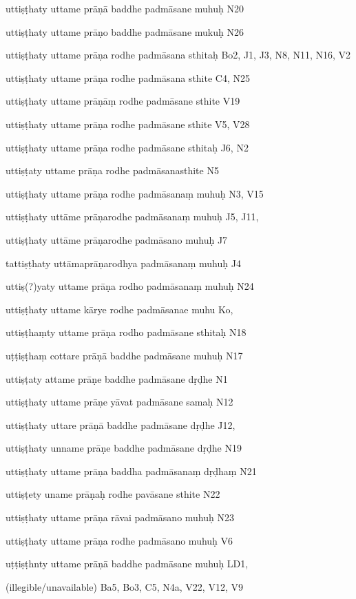 \begin{ekdosis}
\begin{marma}[hp01_055]
\begin{marma}[hp02_009]
\begin{marma}[hp02_011]
\begin{marma}[hp02_012]
\item[uttiṣṭhaty uttame prāṇā baddhe padmāsane muhuḥ] N20
\item[uttiṣṭhaty uttame prāṇo baddhe padmāsane mukuḥ] N26
\item[uttiṣṭhaty uttame prāṇa rodhe padmāsana sthitaḥ] Bo2, J1, J3, N8, N11, N16, V2
\item[uttiṣṭhaty uttame prāṇa rodhe padmāsana sthite] C4, N25
\item[uttiṣṭhaty uttame prāṇāṃ rodhe padmāsane sthite] V19
\item[uttiṣṭhaty uttame prāṇa rodhe padmāsane sthite] V5, V28
\item[uttiṣṭhaty uttame prāṇa rodhe padmāsane sthitaḥ] J6, N2
\item[uttiṣṭaty uttame prāṇa rodhe padmāsanasthite]  N5
\item[uttiṣṭhaty uttame prāṇa rodhe padmāsanaṃ muhuḥ] N3, V15
\item[uttiṣṭhaty uttāme prāṇarodhe padmāsanaṃ muhuḥ] J5, J11,
\item[uttiṣṭhaty uttāme prāṇarodhe padmāsano muhuḥ] J7
\item[tattiṣṭhaty uttāmaprāṇarodhya padmāsanaṃ muhuḥ] J4
\item[uttiṣ(?)yaty uttame prāṇa rodho padmāsanaṃ muhuḥ] N24
\item[uttiṣṭhaty uttame kārye rodhe padmāsanae muhu] Ko,
\item[uttiṣṭhaṃty uttame prāṇa rodho padmāsane sthitaḥ] N18
\item[uṭṭiṣṭhaṃ cottare prāṇā baddhe padmāsane muhuḥ] N17
\item[uttiṣṭaty attame prāṇe baddhe padmāsane dṛḍhe] N1
\item[uttiṣṭhaty uttame prāṇe yāvat padmāsane samaḥ] N12
\item[uttiṣṭhaty uttare prāṇā baddhe padmāsane dṛḍhe] J12,
\item[uttiṣṭhaty unname prāṇe baddhe padmāsane dṛḍhe] N19
\item[uttiṣṭhaty uttame prāṇa baddha padmāsanaṃ dṛḍhaṃ] N21
\item[uttiṣṭety uname prāṇaḥ rodhe pavāsane sthite] N22
\item[uttiṣṭhaty uttame prāṇa rāvai padmāsano muhuḥ] N23
\item[uttiṣṭhaty uttame prāṇa rodhe padmāsano muhuḥ] V6
\item[uṭṭiṣṭhnty uttame prāṇā baddhe padmāsane muhuḥ] LD1,
\item[(illegible/unavailable)]   Ba5, Bo3, C5, N4a, V22, V12, V9
 \begin{description}


\end{description}
\end{marma}
\end{marma}
\end{marma}
\end{marma}
\end{ekdosis}
